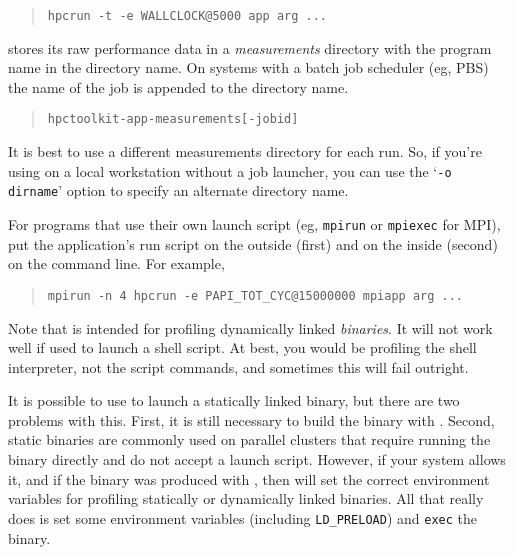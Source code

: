 \begin{quote}
\begin{verbatim}
hpcrun -t -e WALLCLOCK@5000 app arg ...
\end{verbatim}
\end{quote}

\hpcrun{} stores its raw performance data in a {\it measurements}
directory with the program name in the directory name.  On systems
with a batch job scheduler (eg, PBS) the name of the job is appended
to the directory name.

\begin{quote}
\begin{verbatim}
hpctoolkit-app-measurements[-jobid]
\end{verbatim}
\end{quote}

It is best to use a different measurements directory for each run.
So, if you're using \hpcrun{} on a local workstation without a job
launcher, you can use the `{\tt -o dirname}' option to specify an
alternate directory name.

For programs that use their own launch script (eg, {\tt mpirun} or
{\tt mpiexec} for MPI), put the application's run script on the
outside (first) and \hpcrun{} on the inside (second) on the command
line.  For example,

\begin{quote}
\begin{verbatim}
mpirun -n 4 hpcrun -e PAPI_TOT_CYC@15000000 mpiapp arg ...
\end{verbatim}
\end{quote}

Note that \hpcrun{} is intended for profiling dynamically linked {\it
binaries}.  It will not work well if used to launch a shell script.
At best, you would be profiling the shell interpreter, not the script
commands, and sometimes this will fail outright.

It is possible to use \hpcrun{} to launch a statically linked binary,
but there are two problems with this.  First, it is still necessary to
build the binary with \hpclink{}.  Second, static binaries are
commonly used on parallel clusters that require running the binary
directly and do not accept a launch script.  However, if your system
allows it, and if the binary was produced with \hpclink, then
\hpcrun{} will set the correct environment variables for profiling
statically or dynamically linked binaries.  All that \hpcrun{} really
does is set some environment variables (including \verb|LD_PRELOAD|)
and {\tt exec} the binary.


